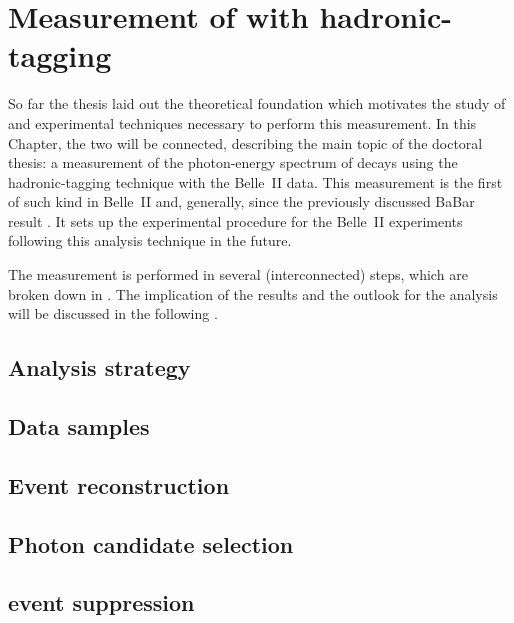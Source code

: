 \chapter{Measurement of \safeBtoXsgamma with hadronic-tagging}\label{ch:analysis}

So far the thesis laid out the theoretical foundation which motivates the study of \BtoXsgamma 
and experimental techniques necessary to perform this measurement.
In this Chapter, the two will be connected, describing the main topic of the doctoral thesis: 
a measurement of the photon-energy spectrum of \BtoXsgamma decays using the hadronic-tagging technique with the Belle~II data.
This measurement is the first of such kind in Belle~II and, generally, since the previously discussed BaBar result \cite{BaBar:2007yhb}.
It sets up the experimental procedure for the Belle~II experiments following this analysis technique in the future.

The measurement is performed in several (interconnected) steps, which are broken down in .
The implication of the results and the outlook for the analysis will be discussed in the following .


\section{Analysis strategy}\label{sec:analysis_strategy}


\section{Data samples}\label{sec:data_samples}


\section{Event reconstruction}\label{sec:event_reconstruction}


\section{Photon candidate selection}\label{sec:photon_selection}


\section{\texorpdfstring{\MakeLowercase{\epem\ra\qqbar}}{e+e-->qqbar} event suppression}\label{sec:continuum_suppression}


